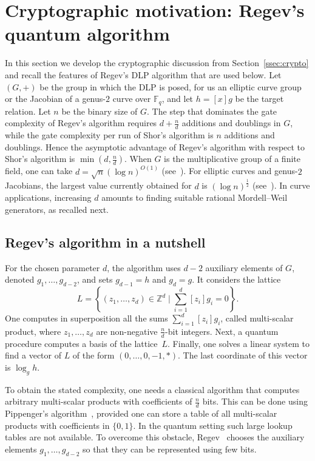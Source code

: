 \documentclass{amsart}
\newcommand{\Z}{{\mathbb Z}}
\newcommand{\F}{{\mathbb F}}
\begin{document}
\section{Cryptographic motivation: Regev's quantum algorithm}
\label{sec:cryptomotivation}


In this section we develop the cryptographic discussion from
Section~\ref{ssec:crypto} and recall the features of Regev's DLP algorithm that
are used below. Let \((G,+)\) be the group in which the DLP is posed, for us an
elliptic curve group or the Jacobian of a genus-\(2\) curve over \(\F_q\), and
let \(h=[x]g\) be the target relation. Let \(n\) be the binary size of \(G\).
The step that dominates the gate complexity of Regev's algorithm requires
\(d+\frac{n}{d}\) additions and doublings in \(G\), while the gate complexity per
run of Shor's algorithm is \(n\) additions and doublings. Hence the asymptotic
advantage of Regev's algorithm with respect to Shor's algorithm is
\(\min(d,\frac{n}{d})\). When \(G\) is the multiplicative group of a finite
field, one can take \(d=\sqrt{n}(\log n)^{O(1)}\) (see~\cite{Pilatte2026}). For
elliptic curves and genus-\(2\) Jacobians, the largest value currently obtained
for \(d\) is \((\log n)^{\frac{1}{2}}\)
(see~\cite{BarbulescuBarcauPasol2025}). In curve applications, increasing \(d\)
amounts to finding suitable rational Mordell--Weil generators, as recalled next.
 




\subsection{Regev's algorithm in a nutshell}\label{ssec:Regev}

For the chosen parameter \(d\), the algorithm uses \(d-2\) auxiliary elements of
\(G\), denoted \(g_1,\ldots,g_{d-2}\), and sets \(g_{d-1}=h\) and \(g_d=g\).
It considers the lattice
 \begin{equation}\label{eq:L}
 L=\left\{(z_1,\ldots,z_d)\in \Z^d\mid \sum_{i=1}^d [z_i]g_i=0\right\}. 
 \end{equation}
One computes in superposition all the sums $\sum_{i=1}^d [z_i]g_i$, called multi-scalar product, where $z_1,\ldots,z_d$ are non-negative $\frac{n}{d}$-bit integers. Next, a quantum procedure computes a basis of the lattice~$L$. Finally, one solves a linear system to find a vector of $L$ of the form $(0,\ldots,0,-1,*)$. The last coordinate of this vector is $\log_gh$. 

To obtain the stated complexity, one needs a classical algorithm that computes
arbitrary multi-scalar products with coefficients of $\frac{n}{d}$ bits. This can
be done using Pippenger's algorithm~\cite{Pippenger1980}, provided one can store
a table of all multi-scalar products with coefficients in $\{0,1\}$. In the
quantum setting such large lookup tables are not available. To overcome this
obstacle, Regev~\cite{Regev2023} chooses the auxiliary elements
$g_1,\ldots,g_{d-2}$ so that they can be represented using few bits. 
\end{document}
